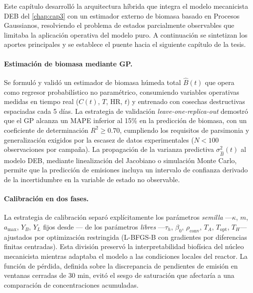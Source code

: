 
Este capítulo desarrolló la arquitectura híbrida que integra el modelo mecanicista DEB del \cref{chap:cap3} con un estimador externo de biomasa basado en Procesos Gaussianos, resolviendo el problema de estados parcialmente observables que limitaba la aplicación operativa del modelo puro. A continuación se sintetizan los aportes principales y se establece el puente hacia el siguiente capítulo de la tesis.

\paragraph{Estimación de biomasa mediante GP.}
Se formuló y validó un estimador de biomasa húmeda total $\hat{B}(t)$ que opera como regresor probabilístico no paramétrico, consumiendo variables operativas medidas en tiempo real ($C(t)$, $T$, HR, $t$) y entrenado con cosechas destructivas espaciadas cada \num{5} días. La estrategia de validación \emph{leave-one-replica-out} demostró que el GP alcanza un MAPE inferior al \num{15}\% en la predicción de biomasa, con un coeficiente de determinación $R^{2} \geq \num{0.70}$, cumpliendo los requisitos de parsimonia y generalización exigidos por la escasez de datos experimentales ($N < \num{100}$ observaciones por campaña). La propagación de la varianza predictiva $\sigma^{2}_{\hat{B}}(t)$ al modelo DEB, mediante linealización del Jacobiano o simulación Monte Carlo, permite que la predicción de emisiones incluya un intervalo de confianza derivado de la incertidumbre en la variable de estado no observable.

\paragraph{Calibración en dos fases.}
La estrategia de calibración separó explícitamente los parámetros \emph{semilla} —$\kappa$, $m$, $a_{\max}$, $Y_B$, $Y_L$ fijos desde \textcite{eriksenDynamicModellingFeed2022}— de los parámetros \emph{libres} —$\tau_h$, $\beta_0$, $\rho_{\mathrm{conv}}$, $T_A$, $T_{\mathrm{opt}}$, $T_H$— ajustados por optimización restringida (L-BFGS-B con gradientes por diferencias finitas centradas). Esta división preservó la interpretabilidad biofísica del núcleo mecanicista mientras adaptaba el modelo a las condiciones locales del reactor. La función de pérdida, definida sobre la discrepancia de pendientes de emisión en ventanas cerradas de \num{30} min, evitó el sesgo de saturación que afectaría a una comparación de concentraciones acumuladas.

